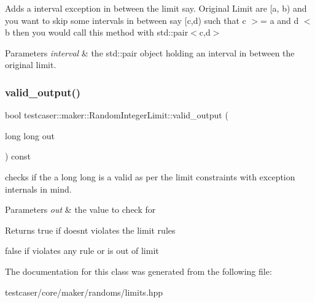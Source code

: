 Adds a interval exception in between the limit say. Original Limit are \mbox{[}a, b) and you want to skip some intervals in between say \mbox{[}c,d) such that c $>$= a and d $<$ b then you would call this method with std\+::pair$<$c,d$>$ 


\begin{DoxyParams}{Parameters}
{\em interval} & the std\+::pair object holding an interval in between the original limit. \\
\hline
\end{DoxyParams}
\mbox{\label{classtestcaser_1_1maker_1_1RandomIntegerLimit_a3015e3b8e3c490e9acad46faf8c2bc96}} 
\subsubsection{\texorpdfstring{valid\+\_\+output()}{valid\_output()}}
{\footnotesize\ttfamily bool testcaser\+::maker\+::\+Random\+Integer\+Limit\+::valid\+\_\+output (\begin{DoxyParamCaption}\item[{long long}]{out }\end{DoxyParamCaption}) const\hspace{0.3cm}{\ttfamily [inline]}}



checks if the a long long is a valid as per the limit constraints with exception internals in mind. 


\begin{DoxyParams}{Parameters}
{\em out} & the value to check for \\
\hline
\end{DoxyParams}
\begin{DoxyReturn}{Returns}
true if doesn\textquotesingle{}t violates the limit rules 

false if violates any rule or is out of limit 
\end{DoxyReturn}


The documentation for this class was generated from the following file\+:\begin{DoxyCompactItemize}
\item 
testcaser/core/maker/randoms/limits.\+hpp\end{DoxyCompactItemize}
